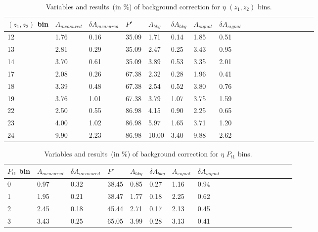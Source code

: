 \begin{table}[H]\footnotesize
\centering
\begin{tabular}{|l|l|l|l|l|l|l|l|l|l|l|l|l|l|l|l|l|l|}
\\ \hline
$(z_1,z_2)$ bin & $A_{measured}$ & $\delta A_{measured}$ & $P^{\star}$ & $A_{bkg}$ & $\delta A_{bkg}$ & $A_{signal}$ & $\delta A_{signal}$ \\ \hline
12 & 1.76 & 0.16 & 35.09 & 1.71 & 0.14 & 1.85  & 0.51 \\ \hline 
13 & 2.81 & 0.29 & 35.09 & 2.47 & 0.25 & 3.43  & 0.95 \\ \hline 
14 & 3.70 & 0.61 & 35.09 & 3.89 & 0.53 & 3.35  & 2.01 \\ \hline 
17 & 2.08 & 0.26 & 67.38 & 2.32 & 0.28 & 1.96  & 0.41 \\ \hline 
18 & 3.39 & 0.48 & 67.38 & 2.54 & 0.52 & 3.80  & 0.76 \\ \hline 
19 & 3.76 & 1.01 & 67.38 & 3.79 & 1.07 & 3.75  & 1.59 \\ \hline 
22 & 2.50 & 0.55 & 86.98 & 4.15 & 0.90 & 2.25  & 0.65 \\ \hline 
23 & 4.00 & 1.02 & 86.98 & 5.97 & 1.65 & 3.71  & 1.20 \\ \hline 
24 & 9.90 & 2.23 & 86.98 & 10.00 & 3.40 & 9.88  & 2.62 \\ \hline
\end{tabular}
\caption{Variables and results~(in $\%$) of background correction for $\eta$ $(z_1,z_2)$ bins. }
\label{tab:etacomzbkgcor}
\end{table} 

\begin{table}[H]\footnotesize
\centering
\begin{tabular}{|l|l|l|l|l|l|l|l|l|l|l|l|l|l|l|l|l|l|}
\\ \hline
$P_{t1}$ bin & $A_{measured}$ & $\delta A_{measured}$ & $P^{\star}$  & $A_{bkg}$ & $\delta A_{bkg}$ & $A_{signal}$ & $\delta A_{signal}$ \\ \hline
0 & 0.97 & 0.32 & 38.45 & 0.85 & 0.27 & 1.16  & 0.94 \\ \hline 
1 & 1.95 & 0.21 & 38.47 & 1.77 & 0.18 & 2.25  & 0.62 \\ \hline 
2 & 2.45 & 0.18 & 45.44 & 2.71 & 0.17 & 2.13  & 0.45 \\ \hline 
3 & 3.43 & 0.25 & 65.05 & 3.99 & 0.28 & 3.13  & 0.41 \\ \hline 
\end{tabular}
\caption{Variables and results~(in $\%$) of background correction for $\eta$ $P_{t1}$ bins. }
\label{tab:etasinptbkgcor}
\end{table}


